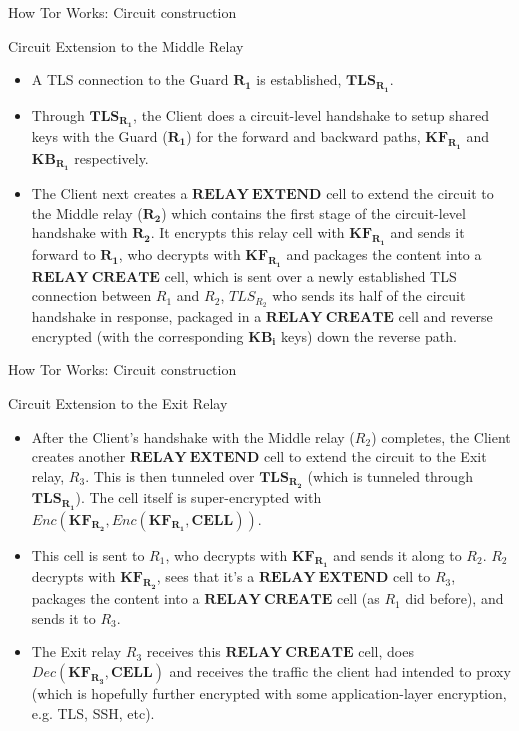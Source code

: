 \documentclass[9pt,a4paper,handout]{beamer}
\begin{document}
\begin{frame}{How Tor Works: Circuit construction}
  \begin{block}{Circuit Extension to the Middle Relay}
    \begin{itemize}
      \item<1-> A TLS connection to the Guard $\mathbf{R_1}$ is established, $\mathbf{TLS_{R_1}}$.
      \item<2-> Through $\mathbf{TLS_{R_1}}$, the Client does a circuit-level handshake to setup
        shared keys with the Guard ($\mathbf{R_1}$) for the forward and backward paths,
        $\mathbf{KF_{R_1}}$ and $\mathbf{KB_{R_1}}$ respectively.
      \item<3-> The Client next creates a $\mathbf{RELAY\:EXTEND}$ cell to extend the circuit to the
        Middle relay ($\mathbf{R_2}$) which contains the first stage of the circuit-level handshake
        with $\mathbf{R_2}$. It encrypts this relay cell with $\mathbf{KF_{R_1}}$ and sends it
        forward to $\mathbf{R_1}$, who decrypts with $\mathbf{KF_{R_1}}$ and packages the content
        into a ${\mathbf{RELAY\:CREATE}}$ cell, which is sent over a newly established TLS
        connection between ${R_1}$ and ${R_2}$, $TLS_{R_2}$ who sends its half of the circuit
        handshake in response, packaged in a ${\mathbf{RELAY\:CREATE}}$ cell and reverse encrypted
        (with the corresponding $\mathbf{KB_i}$ keys) down the reverse path.
  \end{itemize}
  \end{block}
\end{frame}


\begin{frame}{How Tor Works: Circuit construction}
  \begin{block}{Circuit Extension to the Exit Relay}
    \begin{itemize}
      \item<1-> After the Client's handshake with the Middle relay ($R_2$) completes, the Client
        creates another $\mathbf{RELAY\:EXTEND}$ cell to extend the circuit to the Exit relay,
        $R_3$.  This is then tunneled over $\mathbf{TLS_{R_2}}$ (which is tunneled through
        $\mathbf{TLS_{R_1}}$). The cell itself is super-encrypted with \\
        $Enc\left(\mathbf{KF_{R_2}}, Enc\left(\mathbf{KF_{R_1}}, \mathbf{CELL}\right)\right)$.
      \item<2-> This cell is sent to $R_1$, who decrypts with $\mathbf{KF_{R_1}}$ and sends it along
        to $R_2$.  $R_2$ decrypts with $\mathbf{KF_{R_2}}$, sees that it's a
        $\mathbf{RELAY\:EXTEND}$ cell to $R_3$, packages the content into a
        ${\mathbf{RELAY\:CREATE}}$ cell (as $R_1$ did before), and sends it to $R_3$.
      \item<3-> The Exit relay $R_3$ receives this ${\mathbf{RELAY\:CREATE}}$ cell, does
        $Dec\left(\mathbf{KF_{R_3}, CELL}\right)$ and receives the traffic the client had intended
        to proxy (which is hopefully further encrypted with some application-layer encryption,
        e.g. TLS, SSH, etc).  
    \end{itemize}
  \end{block}
\end{frame}
\end{document}
